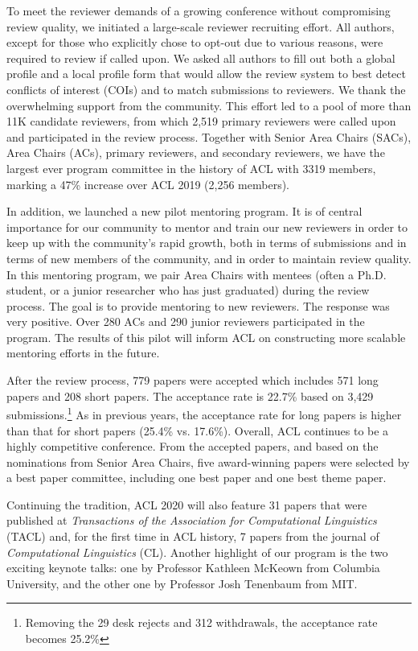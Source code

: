 To meet the reviewer demands of a growing conference without compromising review quality, we initiated a large-scale reviewer recruiting effort.  All authors, except for those who explicitly chose to opt-out due to various reasons,  were required to review if called upon. We asked all authors to fill out both a global profile and a local profile form that would allow the review system to best detect conflicts of interest (COIs) and to match submissions to reviewers. We thank the overwhelming support from the community. This effort led to a pool of more than 11K candidate reviewers, from which 2,519 primary reviewers were called upon and participated in the review process.  Together with Senior Area Chairs (SACs), Area Chairs (ACs), primary reviewers, and secondary reviewers, we have the  largest ever program committee in the history of ACL with 3319 members,  marking a 47\% increase over ACL 2019 (2,256 members).

In addition, we launched a new pilot mentoring program.  It is of central importance for our community to mentor and train our new reviewers in order to keep up with the community's rapid growth, both in terms of submissions and in terms of new members of the community, and in order to maintain review quality.  In this mentoring program, we pair Area Chairs with mentees (often a Ph.D. student, or a junior researcher who has just graduated) during the review process. The goal is to provide
 mentoring to new reviewers. The response was very positive. Over 280  ACs and 290  junior reviewers  participated in the program.   The results of this pilot will inform ACL on constructing more scalable mentoring efforts in the future.

After the review process, 779 papers were accepted which includes  571 long papers and 208 short papers. The acceptance rate is  22.7\% based on 3,429 submissions.\footnote{Removing the 29 desk rejects and 312 withdrawals, the acceptance rate becomes 25.2\%} As in previous years, the acceptance rate for long papers is higher than that for short papers (25.4\% vs. 17.6\%). Overall, ACL continues to be a highly competitive conference. From the accepted papers, and based on the nominations from Senior Area Chairs, five award-winning papers were selected by a best paper committee, including one best paper and one best theme paper.

Continuing the tradition, ACL 2020 will also feature 31 papers that were published at {\em Transactions of the Association for Computational Linguistics} (TACL) and, for the first time in ACL history, 7 papers from the journal of {\em Computational Linguistics} (CL).  Another highlight of our program is the two exciting keynote talks: one by Professor Kathleen McKeown from Columbia University, and the other one by Professor Josh Tenenbaum from MIT. 


